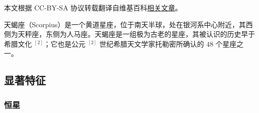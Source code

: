 
本文根据 CC-BY-SA 协议转载翻译自维基百科\href{https://en.wikipedia.org/wiki/Scorpius}{相关文章}。

天蝎座（Scorpius）是一个黄道星座，位于南天半球，处在银河系中心附近，其西侧为天秤座，东侧为人马座。天蝎座是一组极为古老的星座，其被认识的历史早于希腊文化 $^{[2]}$；它也是公元 $^{[2]}$ 世纪希腊天文学家托勒密所确认的 $48$ 个星座之一。

\subsection{显著特征}  
\subsubsection{恒星}
